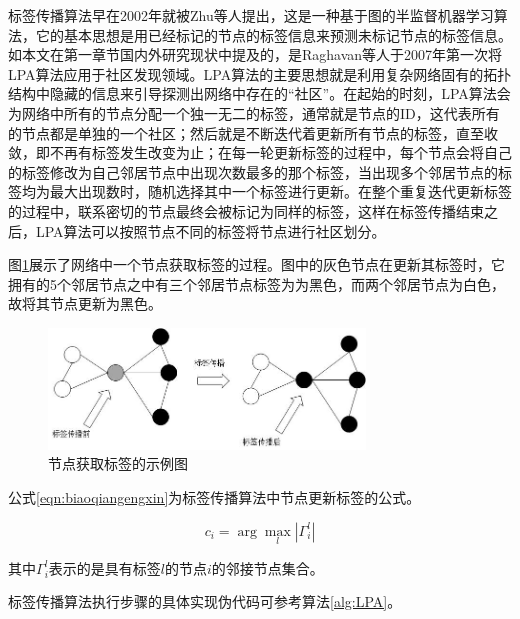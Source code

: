 标签传播算法早在2002年就被Zhu等人\cite{Zhu2002Learning}提出，这是一种基于图的半监督机器学习算法，它的基本思想是用已经标记的节点的标签信息来预测未标记节点的标签信息。如本文在第一章节国内外研究现状中提及的，是Raghavan等人\cite{Raghavan2007Near}于2007年第一次将LPA算法应用于社区发现领域。LPA算法的主要思想就是利用复杂网络固有的拓扑结构中隐藏的信息来引导探测出网络中存在的“社区”。在起始的时刻，LPA算法会为网络中所有的节点分配一个独一无二的标签，通常就是节点的ID，这代表所有的节点都是单独的一个社区；然后就是不断迭代着更新所有节点的标签，直至收敛，即不再有标签发生改变为止；在每一轮更新标签的过程中，每个节点会将自己的标签修改为自己邻居节点中出现次数最多的那个标签，当出现多个邻居节点的标签均为最大出现数时，随机选择其中一个标签进行更新。在整个重复迭代更新标签的过程中，联系密切的节点最终会被标记为同样的标签，这样在标签传播结束之后，LPA算法可以按照节点不同的标签将节点进行社区划分。

图\ref{fig:dingdianbiaoqianchuanbo}展示了网络中一个节点获取标签的过程。图中的灰色节点在更新其标签时，它拥有的5个邻居节点之中有三个邻居节点标签为为黑色，而两个邻居节点为白色，故将其节点更新为黑色。

\begin{figure}
  \centering
  \includegraphics[width=0.75\textwidth]{figures/dingdianbiaoqianchuanbo}
  \caption{节点获取标签的示例图}\label{fig:dingdianbiaoqianchuanbo}
 \end{figure}

公式\ref{eqn:biaoqiangengxin}为标签传播算法中节点更新标签的公式。

\begin{equation}
  \label{eqn:biaoqiangengxin}
  c_i=\arg\max_l \left | \Gamma _i^l \right |
\end{equation}

其中$\Gamma _i^l$表示的是具有标签$l$的节点$i$的邻接节点集合。

标签传播算法执行步骤的具体实现伪代码可参考算法\ref{alg:LPA}。


